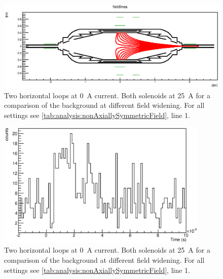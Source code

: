 \begin{figure}
\centering
	\centerline{\includegraphics[width = 1.3\linewidth]{graphics/analysis/monSpec/fieldSimulation/AD.eps} }
	
	\caption[\SI{50}{\ampere} loops]{Two horizontal loops at \SI{0}{\ampere} current. Both solenoids at \SI{25}{\ampere} for a comparison of the background at different field widening. For all settings see \ref{tab:analysis:nonAxiallySymmetricField}, line 1.}
	\label{fig:ADf}
\end{figure}

\begin{figure}[h]
\centering
	\includegraphics[width = 0.9\textwidth]{graphics/analysis/monSpec/AD.eps}
	\caption[\SI{50}{\ampere} loops]{Two horizontal loops at \SI{0}{\ampere} current. Both solenoids at \SI{25}{\ampere} for a comparison of the background at different field widening. For all settings see \ref{tab:analysis:nonAxiallySymmetricField}, line 1.}
	\label{fig:AD}
\end{figure}
\clearpage






